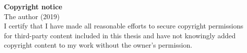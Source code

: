 \textbf{Copyright notice}\\

\textcopyright The author (2019)\\

I certify that I have made all reasonable efforts to secure copyright permissions for third-party content included in this thesis and have not knowingly added copyright content to my work without the owner's permission.


\cleardoublepage

